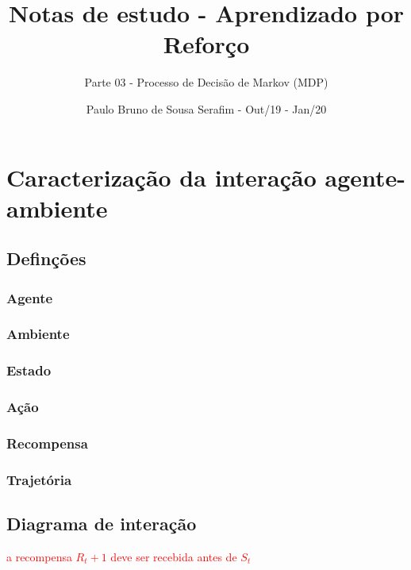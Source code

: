 \documentclass{article}
\title{Notas de estudo - Aprendizado por Reforço}
\author{Parte 03 - Processo de Decisão de Markov (MDP)}
\date{Paulo Bruno de Sousa Serafim - Out/19 - Jan/20}
\begin{document}
\maketitle

\section{Caracterização da interação agente-ambiente}

    \subsection{Definções}
        
        \subsubsection{Agente}
        \subsubsection{Ambiente}
        \subsubsection{Estado}
        \subsubsection{Ação}
        \subsubsection{Recompensa}
        \subsubsection{Trajetória}
        
    \subsection{Diagrama de interação}
    
        \textcolor{red}{a recompensa $R_t+1$ deve ser recebida antes de $S_t$}
    
\end{document}

